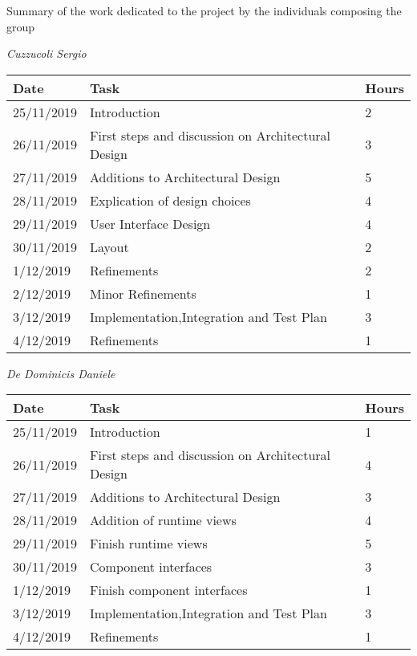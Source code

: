 Summary of the work dedicated to the project by the individuals composing the group

\vspace{1cm}

\textit{Cuzzucoli Sergio}

\hfill

\begin{tabular}{|l|l|l|}

\hline

\textbf{Date} & \textbf{Task} & \textbf{Hours} \\ \hline
25/11/2019 & Introduction &  2 \\ \hline
26/11/2019 & First steps and discussion on Architectural Design & 3 \\ \hline
27/11/2019 & Additions to Architectural Design & 5 \\ \hline
28/11/2019 & Explication of design choices & 4 \\ \hline
29/11/2019 & User Interface Design & 4 \\ \hline
30/11/2019 & Layout & 2 \\ \hline
1/12/2019 & Refinements & 2\\ \hline
2/12/2019 & Minor Refinements & 1\\ \hline
3/12/2019 & Implementation,Integration and Test Plan & 3\\ \hline
4/12/2019 & Refinements & 1\\ \hline
\end{tabular}

\vspace{1cm}

\textit{De Dominicis Daniele}

\hfill

\begin{tabular}{|l|l|l|}

\hline

\textbf{Date} & \textbf{Task} & \textbf{Hours} \\ \hline
25/11/2019 & Introduction &  1 \\ \hline
26/11/2019 & First steps and discussion on Architectural Design & 4 \\ \hline
27/11/2019 & Additions to Architectural Design & 3 \\ \hline
28/11/2019 & Addition of runtime views & 4 \\ \hline
29/11/2019 & Finish runtime views & 5 \\ \hline
30/11/2019 & Component interfaces & 3 \\ \hline
1/12/2019 & Finish component interfaces & 1\\ \hline
3/12/2019 & Implementation,Integration and Test Plan & 3\\ \hline
4/12/2019 & Refinements & 1\\ \hline
\end{tabular}
